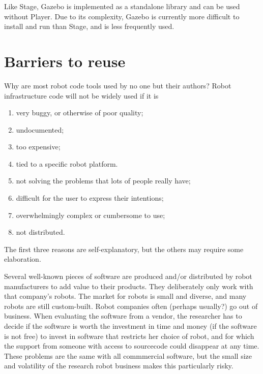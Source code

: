 Like Stage, Gazebo is implemented as a standalone library and can be
used without Player. Due to its complexity, Gazebo is currently more
difficult to install and run than Stage, and is less frequently used.


\section{Barriers to reuse}

Why are most robot code tools used by no one but their authors? Robot
infrastructure code will not be widely used if it is

\begin{enumerate}
\item very buggy, or otherwise of poor quality;
\item undocumented;
\item too expensive;
\item tied to a specific robot platform.
\item not solving the problems that lots of people really have;
\item difficult for the user to express their intentions;
\item overwhelmingly complex or cumbersome to use;
\item not distributed.
\end{enumerate}

The first three reasons are self-explanatory, but the others may
require some elaboration.

Several well-known pieces of software are produced and/or distributed
by robot manufacturers to add value to their products. They
deliberately only work with that company's robots. The market for
robots is small and diverse, and many robots are still
custom-built. Robot companies often (perhaps usually?) go out of
business. When evaluating the software from a vendor, the researcher
has to decide if the software is worth the investment in time and
money (if the software is not free) to invest in software that
restricts her choice of robot, and for which the support from someone
with access to sourcecode could disappear at any time. These problems
are the same with all commmercial software, but the small size and
volatility of the research robot business makes this particularly
risky.

